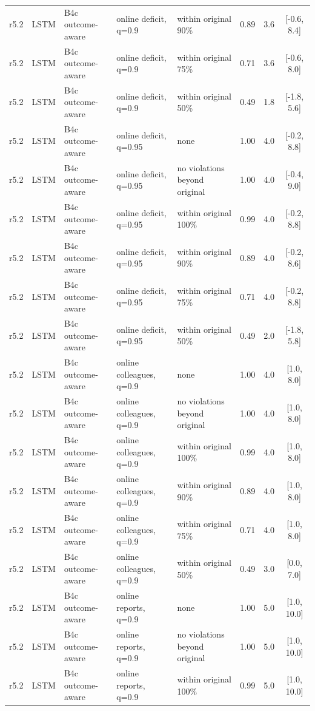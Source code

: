 \begin{longtable}{lllp{4.2cm}p{3.4cm}ccc}
r5.2 & LSTM & B4c outcome-aware & online deficit, q=0.9 & within original 90\% & 0.89 & 3.6 & [-0.6, 8.4] \\
r5.2 & LSTM & B4c outcome-aware & online deficit, q=0.9 & within original 75\% & 0.71 & 3.6 & [-0.6, 8.0] \\
r5.2 & LSTM & B4c outcome-aware & online deficit, q=0.9 & within original 50\% & 0.49 & 1.8 & [-1.8, 5.6] \\
r5.2 & LSTM & B4c outcome-aware & online deficit, q=0.95 & none & 1.00 & 4.0 & [-0.2, 8.8] \\
r5.2 & LSTM & B4c outcome-aware & online deficit, q=0.95 & no violations beyond original & 1.00 & 4.0 & [-0.4, 9.0] \\
r5.2 & LSTM & B4c outcome-aware & online deficit, q=0.95 & within original 100\% & 0.99 & 4.0 & [-0.2, 8.8] \\
r5.2 & LSTM & B4c outcome-aware & online deficit, q=0.95 & within original 90\% & 0.89 & 4.0 & [-0.2, 8.6] \\
r5.2 & LSTM & B4c outcome-aware & online deficit, q=0.95 & within original 75\% & 0.71 & 4.0 & [-0.2, 8.8] \\
r5.2 & LSTM & B4c outcome-aware & online deficit, q=0.95 & within original 50\% & 0.49 & 2.0 & [-1.8, 5.8] \\
r5.2 & LSTM & B4c outcome-aware & online colleagues, q=0.9 & none & 1.00 & 4.0 & [1.0, 8.0] \\
r5.2 & LSTM & B4c outcome-aware & online colleagues, q=0.9 & no violations beyond original & 1.00 & 4.0 & [1.0, 8.0] \\
r5.2 & LSTM & B4c outcome-aware & online colleagues, q=0.9 & within original 100\% & 0.99 & 4.0 & [1.0, 8.0] \\
r5.2 & LSTM & B4c outcome-aware & online colleagues, q=0.9 & within original 90\% & 0.89 & 4.0 & [1.0, 8.0] \\
r5.2 & LSTM & B4c outcome-aware & online colleagues, q=0.9 & within original 75\% & 0.71 & 4.0 & [1.0, 8.0] \\
r5.2 & LSTM & B4c outcome-aware & online colleagues, q=0.9 & within original 50\% & 0.49 & 3.0 & [0.0, 7.0] \\
r5.2 & LSTM & B4c outcome-aware & online reports, q=0.9 & none & 1.00 & 5.0 & [1.0, 10.0] \\
r5.2 & LSTM & B4c outcome-aware & online reports, q=0.9 & no violations beyond original & 1.00 & 5.0 & [1.0, 10.0] \\
r5.2 & LSTM & B4c outcome-aware & online reports, q=0.9 & within original 100\% & 0.99 & 5.0 & [1.0, 10.0] \\

\end{longtable}
